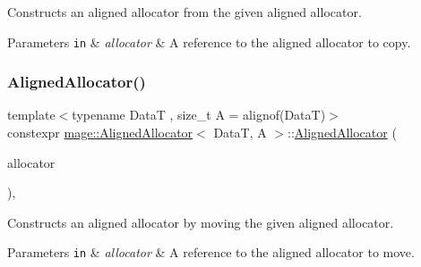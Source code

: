 Constructs an aligned allocator from the given aligned allocator.


\begin{DoxyParams}[1]{Parameters}
\mbox{\tt in}  & {\em allocator} & A reference to the aligned allocator to copy. \\
\hline
\end{DoxyParams}
\mbox{\label{classmage_1_1_aligned_allocator_abb18e578e653ebfaa76523f2c0e1ce70}} 
\subsubsection{\texorpdfstring{Aligned\+Allocator()}{AlignedAllocator()}\hspace{0.1cm}{\footnotesize\ttfamily [3/4]}}
{\footnotesize\ttfamily template$<$typename DataT , size\+\_\+t A = alignof(\+Data\+T)$>$ \\
constexpr \mbox{\hyperlink{classmage_1_1_aligned_allocator}{mage\+::\+Aligned\+Allocator}}$<$ DataT, A $>$\+::\mbox{\hyperlink{classmage_1_1_aligned_allocator}{Aligned\+Allocator}} (\begin{DoxyParamCaption}\item[{\mbox{\hyperlink{classmage_1_1_aligned_allocator}{Aligned\+Allocator}}$<$ DataT, A $>$ \&\&}]{allocator }\end{DoxyParamCaption})\hspace{0.3cm}{\ttfamily [default]}, {\ttfamily [noexcept]}}

Constructs an aligned allocator by moving the given aligned allocator.


\begin{DoxyParams}[1]{Parameters}
\mbox{\tt in}  & {\em allocator} & A reference to the aligned allocator to move. \\
\hline
\end{DoxyParams}
\mbox{\label{classmage_1_1_aligned_allocator_a4320981934c5b21e685b209a263eba21}} 
